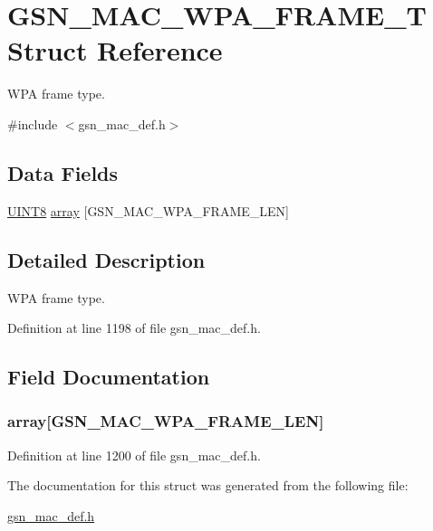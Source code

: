 \hypertarget{a00137}{
\section{GSN\_\-MAC\_\-WPA\_\-FRAME\_\-T Struct Reference}
\label{a00137}
}


WPA frame type.  




{\ttfamily \#include $<$gsn\_\-mac\_\-def.h$>$}

\subsection*{Data Fields}
\begin{DoxyCompactItemize}
\item 
\hyperlink{a00660_gab27e9918b538ce9d8ca692479b375b6a}{UINT8} \hyperlink{a00137_a89413810896e4892034027f57c2f86f3}{array} \mbox{[}GSN\_\-MAC\_\-WPA\_\-FRAME\_\-LEN\mbox{]}
\end{DoxyCompactItemize}


\subsection{Detailed Description}
WPA frame type. 

Definition at line 1198 of file gsn\_\-mac\_\-def.h.



\subsection{Field Documentation}
\hypertarget{a00137_a89413810896e4892034027f57c2f86f3}{
\subsubsection[{array}]{ {\bf array}\mbox{[}GSN\_\-MAC\_\-WPA\_\-FRAME\_\-LEN\mbox{]}}}
\label{a00137_a89413810896e4892034027f57c2f86f3}


Definition at line 1200 of file gsn\_\-mac\_\-def.h.



The documentation for this struct was generated from the following file:\begin{DoxyCompactItemize}
\item 
\hyperlink{a00522}{gsn\_\-mac\_\-def.h}\end{DoxyCompactItemize}
